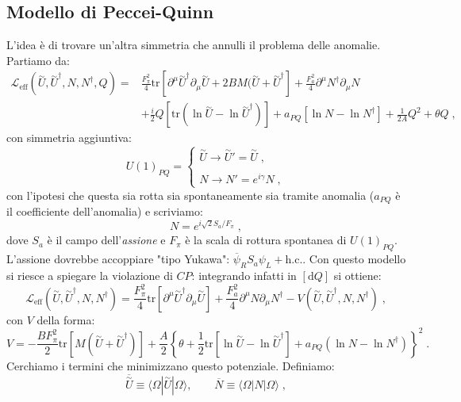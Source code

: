 \documentclass[12pt,a4paper]{article}
\theoremstyle{definition}
\newcommand{\lag}{\mathcal{L}}
\newcommand{\diff}[1][]{\mathrm{d}#1}
\newcommand{\bra}{\langle}
\newcommand{\ket}{\rangle}
\newcommand{\adj}[1]{#1^{\dagger}}
\newcommand{\tr}{\mathrm{tr}}
\numberwithin{equation}{section}
\begin{document}
\subsection{Modello di Peccei-Quinn}
L'idea è di trovare un'altra simmetria che annulli il problema delle anomalie. Partiamo da:
\begin{align*}
\lag_{\mathrm{eff}}(\stackrel{\sim}{U},\adj{\stackrel{\sim}{U}},N,\adj{N},Q) =&\frac{F_{\pi}^2}{4}\tr[\partial^{\mu}\adj{\stackrel{\sim}{U}}\partial_{\mu}\stackrel{\sim}{U}+2BM(\stackrel{\sim}{U}+\adj{\stackrel{\sim}{U}}]+\frac{F_a^2}{4}\partial^{\mu}\adj{N}\partial_{\mu}N \\
&+\frac{i}{2}Q[\tr(\ln\stackrel{\sim}{U}-\ln\adj{\stackrel{\sim}{U}})]+a_{PQ}[\ln N-\ln\adj{N}]+\frac{1}{2A}Q^2+\theta Q\;,
\end{align*}
con simmetria aggiuntiva:
\begin{equation}
U(1)_{PQ}=\begin{cases}
\stackrel{\sim}{U}\to\stackrel{\sim}{U}'=\stackrel{\sim}{U}\;, \\
\\
N\to N'=e^{i\gamma}N\;,
\end{cases}
\end{equation}
con l'ipotesi che questa sia rotta sia spontaneamente sia tramite anomalia ($a_{PQ}$ è il coefficiente dell'anomalia) e scriviamo:
$$
N=e^{i\sqrt{2}S_a/F_{\pi}}\;,
$$
dove $S_a$ è il campo dell'\emph{assione} e $F_{\pi}$ è la scala di rottura spontanea di $U(1)_{PQ}$. L'assione dovrebbe accoppiare "tipo Yukawa": $\overline{\psi}_RS_a\psi_L+\mathrm{h.c.}$. Con questo modello si riesce a spiegare la violazione di $CP$: integrando infatti in $[\diff{Q}]$ si ottiene:
\begin{equation}
\lag_{\mathrm{eff}}(\stackrel{\sim}{U},\adj{\stackrel{\sim}{U}},N,\adj{N})=\frac{F_{\pi}^2}{4}\tr[\partial^{\mu}\adj{\stackrel{\sim}{U}}\partial_{\mu}\stackrel{\sim}{U}]+\frac{F_a^2}{4}\partial^{\mu}N\partial_{\mu}\adj{N}-V(\stackrel{\sim}{U},\adj{\stackrel{\sim}{U}},N,\adj{N})\;,
\end{equation}
con $V$ della forma:
\begin{equation}
V=-\frac{BF_{\pi}^2}{2}\tr[M(\stackrel{\sim}{U}+\adj{\stackrel{\sim}{U}})]+\frac{A}{2}\left\{\theta+\frac{1}{2}\tr[\ln\stackrel{\sim}{U}-\ln\adj{\stackrel{\sim}{U}}]+a_{PQ}(\ln N-\ln\adj{N})\right\}^2\;.
\end{equation}
Cerchiamo i termini che minimizzano questo potenziale. Definiamo:
$$
\overline{\stackrel{\sim}{U}}\equiv\bra\Omega|\stackrel{\sim}{U}|\Omega\ket,\qquad \overline{N}\equiv\bra\Omega|N|\Omega\ket\;,
$$
\end{document}
